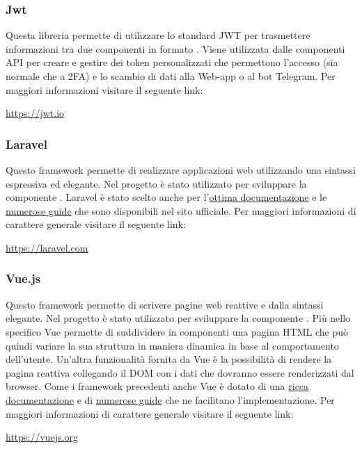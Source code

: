 		\subsubsection{Jwt}
			Questa libreria permette di utilizzare lo standard JWT per trasmettere informazioni tra due componenti in formato . Viene utilizzata dalle componenti API per creare e gestire dei token personalizzati che permettono l'accesso (sia normale che a 2FA) e lo scambio di dati alla Web-app o al bot Telegram.
			\newline
			Per maggiori informazioni visitare il seguente link:
			\newline
			\begin{center}
				\url{https://jwt.io}
			\end{center}
		\subsubsection{Laravel}
			Questo framework permette di realizzare applicazioni web utilizzando una sintassi espressiva ed elegante. Nel progetto è stato utilizzato per sviluppare la componente . Laravel è stato scelto anche per l'\href{https://laravel.com/docs/7.x}{ottima documentazione} e le \href{https://laravel.com/docs/7.x/routing}{numerose guide} che sono disponibili nel sito ufficiale.
			\newline
			Per maggiori informazioni di carattere generale visitare il seguente link:
			\newline
			\begin{center}
				\url{https://laravel.com}
			\end{center}
		\subsubsection{Vue.js}
			Questo framework permette di scrivere pagine web reattive e dalla sintassi elegante. Nel progetto è stato utilizzato per sviluppare la componente . Più nello specifico Vue permette di suddividere in componenti una pagina HTML che può quindi variare la sua struttura in maniera dinamica in base al comportamento dell'utente. Un'altra funzionalità fornita da Vue è la possibilità di rendere la pagina reattiva collegando il DOM con i dati che dovranno essere renderizzati dal browser.
			Come i framework precedenti anche Vue è dotato di una \href{https://vuejs.org/v2/api/}{ricca documentazione} e di \href{https://vuejs.org/v2/guide/index.html}{numerose guide} che ne facilitano l'implementazione. 
			\newline
			Per maggiori informazioni di carattere generale visitare il seguente link:
			\newline
			\begin{center}
				\url{https://vuejs.org}
			\end{center}
